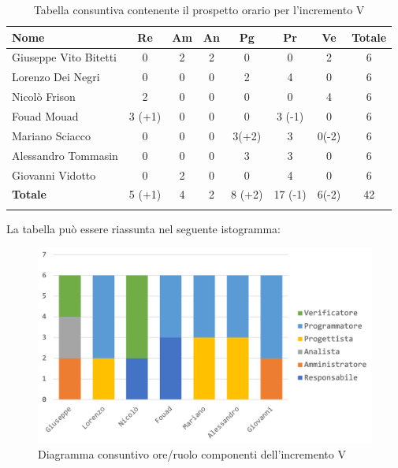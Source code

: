 			\begin{longtable}{|l|c|c|c|c|c|c|c|}
				\hline
				\rowcolor{lighter-grayer}
				\textbf{Nome} & \textbf{Re} & \textbf{Am} & \textbf{An} & \textbf{Pg}  & \textbf{Pr}   & \textbf{Ve} & \textbf{Totale} \\
				\hline
				\endfirsthead
				\hline
				Giuseppe Vito Bitetti & 0 & 2 & 2 & 0 & 0 & 2 & 6\\
				\hline
				\hline
				Lorenzo Dei Negri & 0 & 0 & 0 & 2 & 4 & 0 & 6\\
				\hline
				\hline
				Nicolò Frison & 2 & 0 & 0 & 0 & 0 & 4 & 6\\
				\hline
				\hline
				Fouad Mouad & 3 (+1) & 0 & 0 & 0 & 3 (-1) & 0 & 6 \\
				\hline
				\hline
				Mariano Sciacco & 0 & 0 & 0 & 3(+2) & 3 & 0(-2) & 6\\
				\hline
				\hline
				Alessandro Tommasin & 0 & 0 & 0 & 3 & 3 & 0 & 6\\
				\hline
				\hline
				Giovanni Vidotto & 0 & 2 & 0 & 0 & 4 & 0 & 6\\
				\hline 
				\textbf{Totale} & 5 (+1) & 4 & 2 & 8 (+2) & 17 (-1) & 6(-2) & 42 \\
				\hline 
				
				\caption{Tabella consuntiva contenente il prospetto orario per l'incremento V}
			\end{longtable}	
			
			La tabella può essere riassunta nel seguente istogramma:
			
			\begin{figure}[H]
				\centering
				\includegraphics[width=0.75\linewidth]{images/consuntivo/ConsIncr5-1.png}
				\caption{Diagramma consuntivo ore/ruolo componenti dell'incremento V}
				\label{fig:consuntivo diagramma suddivisione ruoli incremento V}
			\end{figure}
			
